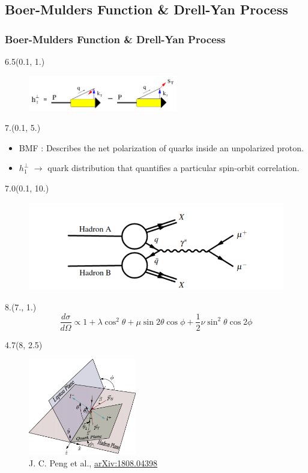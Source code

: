 \documentclass[12pt, xcolor={dvipsnames}, aspectratio = 169, sans, mathserif]{beamer}
\newenvironment{List}[2]
{\begin{textblock}{#1}#2
\begin{itemize}}
{\end{itemize}
\end{textblock}}
\newenvironment{Pic}[2]
{\begin{textblock}{#1}#2
\begin{figure}}
{\end{figure}
\end{textblock}}
\newcommand{\NewCaption}[3]{\caption{{#1}, \textcolor{blue}{\href{#2}{#3}}}}
\begin{document}
\subsection{Boer-Mulders Function \& Drell-Yan Process}
\begin{frame}
\frametitle{Boer-Mulders Function \& Drell-Yan Process}

\begin{Pic}{6.5}{(0.1, 1.)}
  \includegraphics[width=6.5cm]{imgs/BMF.png}
\end{Pic}

\begin{List}{7.}{(0.1, 5.)}

  \item BMF : Describes the net polarization of quarks inside an unpolarized proton.

  \item $h_{1}^{\perp}$ $\rightarrow$ quark distribution that quantifies a particular spin-orbit correlation.

\end{List}

\begin{Pic}{7.0}{(0.1, 10.)}
  \includegraphics[width=7.cm]{imgs/drell-yan.png}
\end{Pic}

\begin{textblock}{8.}(7., 1.)
\begin{equation*}
\frac{d\sigma}{d\Omega} \propto 1  + \lambda \cos^{2}\theta + \mu \sin 2 \theta \cos \phi + \frac{1}{2}\nu \sin^{2}\theta \cos 2 \phi
\end{equation*}
\end{textblock}

\begin{Pic}{4.7}{(8, 2.5)}
  \NewCaption{J. C. Peng et al.}{https://arxiv.org/abs/1808.04398}{arXiv:1808.04398}
  \includegraphics[width=4.7cm]{imgs/three_plane_newest.png}
\end{Pic}


\end{frame}
\end{document}
